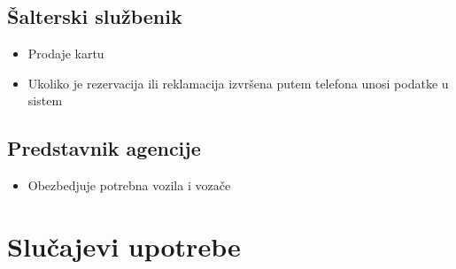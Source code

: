 \subsection{\v Salterski slu\v zbenik}
\begin{itemize}
	\item Prodaje kartu
	\item Ukoliko je rezervacija ili reklamacija izvr\v sena putem telefona unosi podatke u sistem
\end{itemize}
\subsection{Predstavnik agencije}
\begin{itemize}
	\item Obezbedj{}uje potrebna vozila i voza\v ce
\end{itemize}

\newpage
\section{Slu\v cajevi upotrebe}
